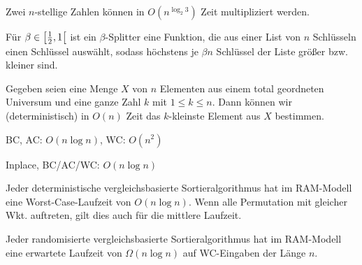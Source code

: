 \documentclass{cheat-sheet}
\begin{document}

\begin{satz}
  Zwei $n$-stellige Zahlen können in $O(n^{\log_2 3})$ Zeit multipliziert werden.
\end{satz}


\begin{defn}
  Für $\beta \in \left[ \tfrac{1}{2}, 1 \right[$ ist ein $\beta$-Splitter eine Funktion, die aus einer List von $n$ Schlüsseln einen Schlüssel auswählt, sodass höchstens je $\beta n$ Schlüssel der Liste größer bzw. kleiner sind.
\end{defn}

\begin{satz}[Selektion]
  Gegeben seien eine Menge $X$ von $n$ Elementen aus einem total geordneten Universum und eine ganze Zahl $k$ mit $1 \leq k \leq n$. Dann können wir (deterministisch) in $O(n)$ Zeit das $k$-kleinste Element aus $X$ bestimmen.
\end{satz}


\begin{alg}[Quicksort]
  BC, AC: $O(n \log n)$, WC: $O(n^2)$
\end{alg}


\begin{alg}[Heapsort]
  Inplace, BC/AC/WC: $O(n \log n)$
\end{alg}


\begin{satz}
  Jeder deterministische vergleichsbasierte Sortieralgorithmus hat im RAM-Modell eine Worst-Case-Laufzeit von $O(n \log n)$. Wenn alle Permutation mit gleicher Wkt. auftreten, gilt dies auch für die mittlere Laufzeit.
\end{satz}

\begin{satz}
  Jeder randomisierte vergleichsbasierte Sortieralgorithmus hat im RAM-Modell eine erwartete Laufzeit von $\Omega(n \log n)$ auf WC-Eingaben der Länge $n$.
\end{satz}


\end{document}
